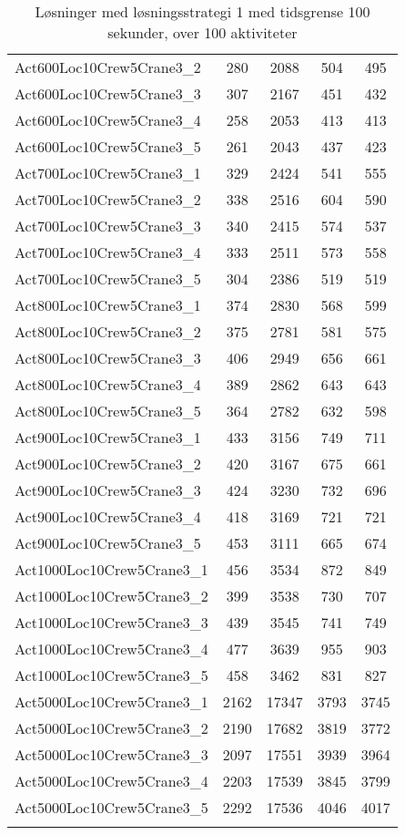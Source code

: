 {\begin{center}
\begin{longtable}{ | l | c | c | c | c | }
Act600Loc10Crew5Crane3\_2	&	280	&	2088	&	504	&	495	\\
Act600Loc10Crew5Crane3\_3	&	307	&	2167	&	451	&	432	\\
Act600Loc10Crew5Crane3\_4	&	258	&	2053	&	413	&	413	\\
Act600Loc10Crew5Crane3\_5	&	261	&	2043	&	437	&	423	\\
Act700Loc10Crew5Crane3\_1	&	329	&	2424	&	541	&	555	\\
Act700Loc10Crew5Crane3\_2	&	338	&	2516	&	604	&	590	\\
Act700Loc10Crew5Crane3\_3	&	340	&	2415	&	574	&	537	\\
Act700Loc10Crew5Crane3\_4	&	333	&	2511	&	573	&	558	\\
Act700Loc10Crew5Crane3\_5	&	304	&	2386	&	519	&	519	\\
Act800Loc10Crew5Crane3\_1	&	374	&	2830	&	568	&	599	\\
Act800Loc10Crew5Crane3\_2	&	375	&	2781	&	581	&	575	\\
Act800Loc10Crew5Crane3\_3	&	406	&	2949	&	656	&	661	\\
Act800Loc10Crew5Crane3\_4	&	389	&	2862	&	643	&	643	\\
Act800Loc10Crew5Crane3\_5	&	364	&	2782	&	632	&	598	\\
Act900Loc10Crew5Crane3\_1	&	433	&	3156	&	749	&	711	\\
Act900Loc10Crew5Crane3\_2	&	420	&	3167	&	675	&	661	\\
Act900Loc10Crew5Crane3\_3	&	424	&	3230	&	732	&	696	\\
Act900Loc10Crew5Crane3\_4	&	418	&	3169	&	721	&	721	\\
Act900Loc10Crew5Crane3\_5	&	453	&	3111	&	665	&	674	\\
Act1000Loc10Crew5Crane3\_1	&	456	&	3534	&	872	&	849	\\
Act1000Loc10Crew5Crane3\_2	&	399	&	3538	&	730	&	707	\\
Act1000Loc10Crew5Crane3\_3	&	439	&	3545	&	741	&	749	\\
Act1000Loc10Crew5Crane3\_4	&	477	&	3639	&	955	&	903	\\
Act1000Loc10Crew5Crane3\_5	&	458	&	3462	&	831	&	827	\\
Act5000Loc10Crew5Crane3\_1	&	2162	&	17347	&	3793	&	3745	\\
Act5000Loc10Crew5Crane3\_2	&	2190	&	17682	&	3819	&	3772	\\
Act5000Loc10Crew5Crane3\_3	&	2097	&	17551	&	3939	&	3964	\\
Act5000Loc10Crew5Crane3\_4	&	2203	&	17539	&	3845	&	3799	\\
Act5000Loc10Crew5Crane3\_5	&	2292	&	17536	&	4046	&	4017	\\
\hline				
\caption{Løsninger med løsningsstrategi 1 med tidsgrense 100 sekunder, over 100 aktiviteter}															
\label{tab:solutionAssignAltRFSTF100s}					
\end{longtable}									
\end{center}

}
